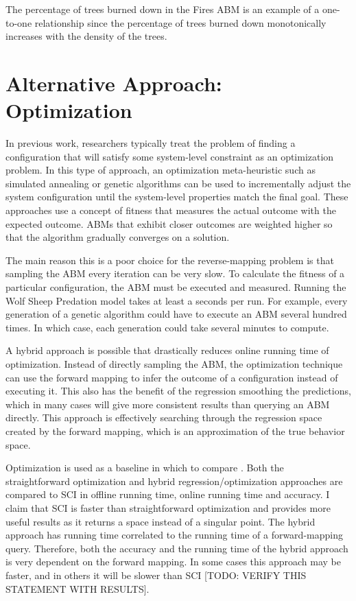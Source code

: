 The percentage of trees burned down in the Fires ABM is an example of a one-to-one relationship since the percentage of trees burned down monotonically increases with the density of the trees.


\section{Alternative Approach: Optimization}
In previous work, researchers typically treat the problem of finding a configuration that will satisfy some system-level constraint as an optimization problem.
In this type of approach, an optimization meta-heuristic such as simulated annealing or genetic algorithms can be used to incrementally adjust the system configuration until the system-level properties match the final goal.
These approaches use a concept of fitness that measures the actual outcome with the expected outcome.
ABMs that exhibit closer outcomes are weighted higher so that the algorithm gradually converges on a solution.

The main reason this is a poor choice for the reverse-mapping problem is that sampling the ABM every iteration can be very slow.
To calculate the fitness of a particular configuration, the ABM must be executed and measured.
Running the Wolf Sheep Predation model takes at least a seconds per run.
For example, every generation of a genetic algorithm could have to execute an ABM several hundred times.
In which case, each generation could take several minutes to compute.

A hybrid approach is possible that drastically reduces online running time of optimization.
Instead of directly sampling the ABM, the optimization technique can use the forward mapping to infer the outcome of a configuration instead of executing it.
This also has the benefit of the regression smoothing the predictions, which in many cases will give more consistent results than querying an ABM directly.
This approach is effectively searching through the regression space created by the forward mapping, which is an approximation of the true behavior space.

Optimization is used as a baseline in which to compare \fw.
Both the straightforward optimization and hybrid regression/optimization approaches are compared to SCI in offline running time, online running time and accuracy.
I claim that SCI is faster than straightforward optimization and provides more useful results as it returns a space instead of a singular point.
The hybrid approach has running time correlated to the running time of a forward-mapping query.
Therefore, both the accuracy and the running time of the hybrid approach is very dependent on the forward mapping.
In some cases this approach may be faster, and in others it will be slower than SCI [TODO: VERIFY THIS STATEMENT WITH RESULTS].

